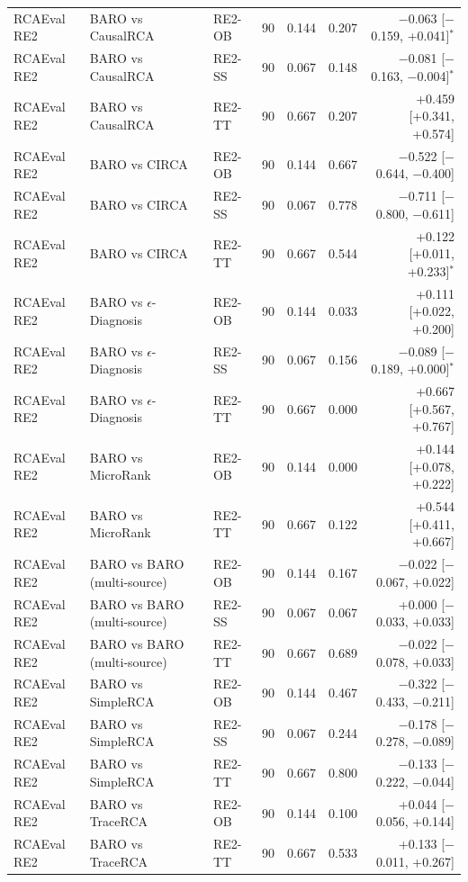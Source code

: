{\begin{longtable}{llllrrr}
RCAEval RE2 & BARO vs CausalRCA & RE2-OB & 90 & 0.144 & 0.207 & $-$0.063 [$-$0.159, +0.041]$^\ast$ \\
RCAEval RE2 & BARO vs CausalRCA & RE2-SS & 90 & 0.067 & 0.148 & $-$0.081 [$-$0.163, $-$0.004]$^\ast$ \\
RCAEval RE2 & BARO vs CausalRCA & RE2-TT & 90 & 0.667 & 0.207 & +0.459 [+0.341, +0.574] \\
RCAEval RE2 & BARO vs CIRCA & RE2-OB & 90 & 0.144 & 0.667 & $-$0.522 [$-$0.644, $-$0.400] \\
RCAEval RE2 & BARO vs CIRCA & RE2-SS & 90 & 0.067 & 0.778 & $-$0.711 [$-$0.800, $-$0.611] \\
RCAEval RE2 & BARO vs CIRCA & RE2-TT & 90 & 0.667 & 0.544 & +0.122 [+0.011, +0.233]$^\ast$ \\
RCAEval RE2 & BARO vs $\epsilon$-Diagnosis & RE2-OB & 90 & 0.144 & 0.033 & +0.111 [+0.022, +0.200] \\
RCAEval RE2 & BARO vs $\epsilon$-Diagnosis & RE2-SS & 90 & 0.067 & 0.156 & $-$0.089 [$-$0.189, +0.000]$^\ast$ \\
RCAEval RE2 & BARO vs $\epsilon$-Diagnosis & RE2-TT & 90 & 0.667 & 0.000 & +0.667 [+0.567, +0.767] \\
RCAEval RE2 & BARO vs MicroRank & RE2-OB & 90 & 0.144 & 0.000 & +0.144 [+0.078, +0.222] \\
RCAEval RE2 & BARO vs MicroRank & RE2-TT & 90 & 0.667 & 0.122 & +0.544 [+0.411, +0.667] \\
RCAEval RE2 & BARO vs BARO (multi-source) & RE2-OB & 90 & 0.144 & 0.167 & $-$0.022 [$-$0.067, +0.022] \\
RCAEval RE2 & BARO vs BARO (multi-source) & RE2-SS & 90 & 0.067 & 0.067 & +0.000 [$-$0.033, +0.033] \\
RCAEval RE2 & BARO vs BARO (multi-source) & RE2-TT & 90 & 0.667 & 0.689 & $-$0.022 [$-$0.078, +0.033] \\
RCAEval RE2 & BARO vs SimpleRCA & RE2-OB & 90 & 0.144 & 0.467 & $-$0.322 [$-$0.433, $-$0.211] \\
RCAEval RE2 & BARO vs SimpleRCA & RE2-SS & 90 & 0.067 & 0.244 & $-$0.178 [$-$0.278, $-$0.089] \\
RCAEval RE2 & BARO vs SimpleRCA & RE2-TT & 90 & 0.667 & 0.800 & $-$0.133 [$-$0.222, $-$0.044] \\
RCAEval RE2 & BARO vs TraceRCA & RE2-OB & 90 & 0.144 & 0.100 & +0.044 [$-$0.056, +0.144] \\
RCAEval RE2 & BARO vs TraceRCA & RE2-TT & 90 & 0.667 & 0.533 & +0.133 [$-$0.011, +0.267] \\

\end{longtable}}

